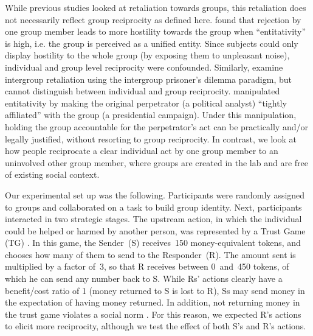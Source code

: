 \documentclass[12pt,a4paper]{article}\usepackage[]{graphicx}\usepackage[]{color}
\begin{document}
While previous studies looked at retaliation towards groups, this retaliation does not necessarily reflect group reciprocity as defined here. \citet{gaertner2008whenrejection} found that rejection by one group member leads to more hostility towards the group when ``entitativity'' is high, i.e. the group is perceived as a unified entity. Since subjects could only display hostility to the whole group (by exposing them to unpleasant noise), individual and group level reciprocity were confounded. Similarly, \citet{bohm2016makes} examine intergroup retaliation using the intergroup prisoner's
dilemma para\-digm, but cannot distinguish between individual and group reciprocity.
\citet{stenstrom2008theroles} manipulated entitativity by making the original perpetrator (a political analyst) ``tightly affiliated'' with the group (a presidential campaign). Under this manipulation, holding the group accountable for the perpetrator's act can be practically and/or legally justified, without resorting to group reciprocity. In contrast, we look at how people reciprocate a clear individual act by one group member to an uninvolved other group member, where groups are created in the lab and are free of existing social context. 


Our experimental set up was the following. Participants were randomly assigned to groups and collaborated on a task to build group identity. Next, participants interacted in two strategic stages. The upstream action, in which the individual could be helped or harmed by another person, was represented by a Trust Game (TG) \citep{berg1995trust}.  In this game, the Sender~(S) receives~150 money-equivalent tokens, and chooses how many of them to send to the Responder~(R). The amount sent is multiplied by a factor of~3, so that R receives between 0~and~450 tokens, of which he can send any number back to S.  While
Rs' actions clearly have a benefit/cost ratio of 1 (money returned to S is lost to R), Ss may send money in the expectation of having
money returned. In addition, not returning money in the trust game violates a social norm \citep{kimbrough2015norms}. For
this reason, we expected R's actions to elicit more reciprocity, although we test the effect of both S's and R's actions.


\end{document}
